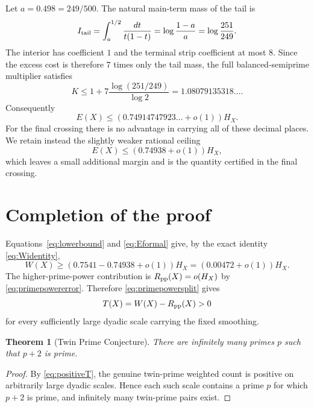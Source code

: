 \documentclass{aomart}
\newtheorem{theorem}{Theorem}[section]
\theoremstyle{definition}
\newcommand{\1}{\mathbf 1}
\begin{document}
Let $a=0.498=249/500$.  The natural main-term mass of the tail is
\begin{equation}\label{eq:Itail}
 I_{\rm tail}=\int_a^{1/2}\frac{dt}{t(1-t)}
 =\log\frac{1-a}{a}=\log\frac{251}{249}.
\end{equation}
The interior has coefficient $1$ and the terminal strip coefficient at most $8$.  Since the excess cost is therefore $7$ times only the tail mass, the full balanced-semiprime multiplier satisfies
\begin{equation}\label{eq:Ktotal}
 K\le1+7\frac{\log(251/249)}{\log2}
 =1.08079135318\ldots.
\end{equation}
Consequently
\begin{equation}\label{eq:Eexact}
 E(X)\le(0.74914747923\ldots+o(1))H_X.
\end{equation}
For the final crossing there is no advantage in carrying all of these decimal places.  We retain instead the slightly weaker rational ceiling
\begin{equation}\label{eq:Eformal}
 E(X)\le(0.74938+o(1))H_X,
\end{equation}
which leaves a small additional margin and is the quantity certified in the final crossing.

\section{Completion of the proof}

Equations~\eqref{eq:lowerbound} and \eqref{eq:Eformal} give, by the exact identity \eqref{eq:Widentity},
\begin{equation}\label{eq:positiveW}
 W(X)\ge(0.7541-0.74938+o(1))H_X
      =(0.00472+o(1))H_X.
\end{equation}
The higher-prime-power contribution is $R_{\rm pp}(X)=o(H_X)$ by \eqref{eq:primepowererror}.  Therefore \eqref{eq:primepowersplit} gives
\begin{equation}\label{eq:positiveT}
 T(X)=W(X)-R_{\rm pp}(X)>0
\end{equation}
for every sufficiently large dyadic scale carrying the fixed smoothing.

\begin{theorem}[Twin Prime Conjecture]\label{thm:TPC}
There are infinitely many primes $p$ such that $p+2$ is prime.
\end{theorem}

\begin{proof}
By \eqref{eq:positiveT}, the genuine twin-prime weighted count is positive on arbitrarily large dyadic scales.  Hence each such scale contains a prime $p$ for which $p+2$ is prime, and infinitely many twin-prime pairs exist.
\end{proof}
\end{document}
